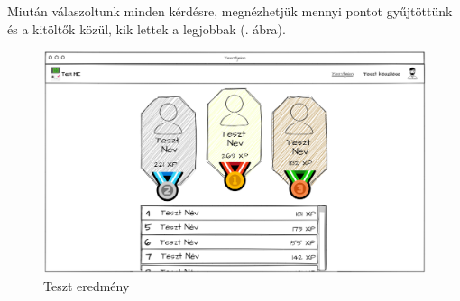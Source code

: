 Miután válaszoltunk minden kérdésre, megnézhetjük mennyi pontot gyűjtöttünk és a kitöltők közül, kik lettek a legjobbak (. ábra).

\begin{figure}[h!]
    \centering
    \includegraphics[width=\linewidth]{images/test3_wireframe.png}
    \caption{Teszt eredmény}
    \label{fig:test_finished}
\end{figure}


